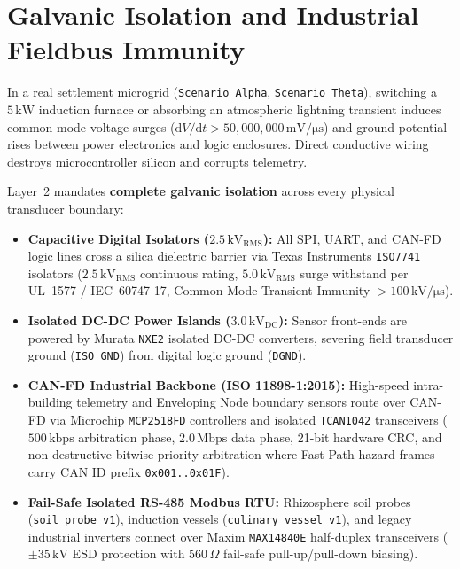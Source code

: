 \section{Galvanic Isolation and Industrial Fieldbus Immunity}
\label{sec:l2-galvanic-isolation}

In a real settlement microgrid (\texttt{Scenario Alpha}, \texttt{Scenario Theta}), switching a $5\,\mathrm{kW}$ induction furnace or absorbing an atmospheric lightning transient induces common-mode voltage surges ($\mathrm{d}V/\mathrm{d}t > 50{,}000{,}000\,\mathrm{mV/\mu s}$) and ground potential rises between power electronics and logic enclosures. Direct conductive wiring destroys microcontroller silicon and corrupts telemetry.

Layer~2 mandates \textbf{complete galvanic isolation} across every physical transducer boundary:
\begin{itemize}
    \item \textbf{Capacitive Digital Isolators ($2.5\,\mathrm{kV}_{\mathrm{RMS}}$):} All SPI, UART, and CAN-FD logic lines cross a silica dielectric barrier via Texas Instruments \texttt{ISO7741} isolators ($2.5\,\mathrm{kV}_{\mathrm{RMS}}$ continuous rating, $5.0\,\mathrm{kV}_{\mathrm{RMS}}$ surge withstand per UL~1577 / IEC~60747-17, Common-Mode Transient Immunity $> 100\,\mathrm{kV/\mu s}$).
    \item \textbf{Isolated DC-DC Power Islands ($3.0\,\mathrm{kV}_{\mathrm{DC}}$):} Sensor front-ends are powered by Murata \texttt{NXE2} isolated DC-DC converters, severing field transducer ground (\texttt{ISO\_GND}) from digital logic ground (\texttt{DGND}).
    \item \textbf{CAN-FD Industrial Backbone (ISO 11898-1:2015):} High-speed intra-building telemetry and Enveloping Node boundary sensors route over CAN-FD \parencite{iso11898_2015} via Microchip \texttt{MCP2518FD} controllers and isolated \texttt{TCAN1042} transceivers ($500\,\mathrm{kbps}$ arbitration phase, $2.0\,\mathrm{Mbps}$ data phase, 21-bit hardware CRC, and non-destructive bitwise priority arbitration where Fast-Path hazard frames carry CAN ID prefix \texttt{0x001..0x01F}).
    \item \textbf{Fail-Safe Isolated RS-485 Modbus RTU:} Rhizosphere soil probes (\texttt{soil\_probe\_v1}), induction vessels (\texttt{culinary\_vessel\_v1}), and legacy industrial inverters connect over Maxim \texttt{MAX14840E} half-duplex transceivers ($\pm 35\,\mathrm{kV}$ ESD protection with $560\,\Omega$ fail-safe pull-up/pull-down biasing).
\end{itemize}


